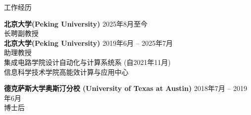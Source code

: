 
\begin{rSection}{工作经历}

{\bf 北京大学(Peking University)}                           \hfill {2025年8月至今} \\
长聘副教授 \\
{\bf 北京大学(Peking University)}                           \hfill {2019年6月 -- 2025年7月} \\
助理教授 \\
集成电路学院设计自动化与计算系统系 (自2021年11月) \\
信息科学技术学院高能效计算与应用中心

{\bf 德克萨斯大学奥斯汀分校 (University of Texas at Austin)} \hfill {2018年7月 -- 2019年6月} \\
博士后

%
%
%
%


\end{rSection}


